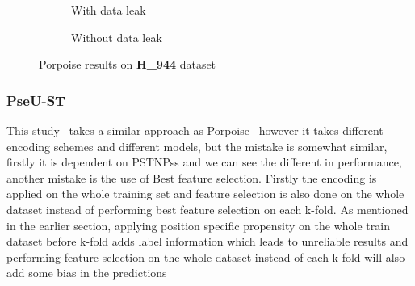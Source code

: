         \begin{figure}[H]
            \centering
            \begin{subfigure}{0.47\textwidth}
              \centering
              \resizebox{\textwidth}{!}{}
              \captionsetup{justification=centering}
              \caption{With data leak}
            \end{subfigure}%
            \hspace{0.05\textwidth}
            \begin{subfigure}{0.47\textwidth}
              \centering
              \resizebox{\textwidth}{!}{}
              \captionsetup{justification=centering}
              \caption{Without data leak}
            \end{subfigure}
            \caption{Porpoise results on \textbf{H\_944} dataset}\label{fig:porpoise_m944}
        \end{figure}

    \subsubsection{PseU-ST}
      This study~\cite{zhang_pseu-st_2023} takes a similar approach as Porpoise~\cite{li_porpoise_2021} however it takes different encoding schemes and different models, but the mistake is somewhat similar, firstly it is dependent on PSTNPss and we can see the different in performance, another mistake is the use of Best feature selection.
      Firstly the encoding is applied on the whole training set and feature selection is also done on the whole dataset instead of performing best feature selection on each k-fold.
      As mentioned in the earlier section, applying position specific propensity on the whole train dataset before k-fold adds label information which leads to unreliable results and performing feature selection on the whole dataset instead of each k-fold will also add some bias in the predictions

